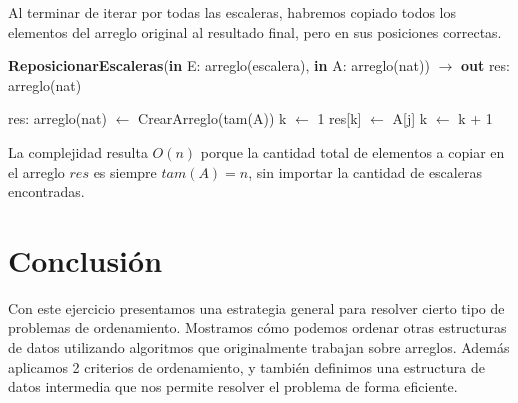 Al terminar de iterar por todas las escaleras, habremos copiado todos los elementos del arreglo original al resultado final, pero en sus posiciones correctas.

\begin{algorithm}[H]
\caption{
    \textbf{ReposicionarEscaleras}(\textbf{in} E: arreglo(escalera), \textbf{in} A: arreglo(nat)) $\to$ \textbf{out} res: arreglo(nat)
}
\begin{algorithmic}[1]
    \State res: arreglo(nat) $\gets$ CrearArreglo(tam(A)) 
    \State k $\gets$ 1
            \State res[k] $\gets$ A[j]
            \State k $\gets$ k + 1
        \EndFor
    \EndFor
\end{algorithmic}
\end{algorithm}

La complejidad resulta $O(n)$ porque la cantidad total de elementos a copiar en el arreglo $res$ es siempre $tam(A) = n$, sin importar la cantidad de escaleras encontradas.


\section*{Conclusión}

Con este ejercicio presentamos una estrategia general para resolver cierto tipo de problemas de ordenamiento. Mostramos cómo podemos ordenar otras estructuras de datos utilizando algoritmos que originalmente trabajan sobre arreglos. Además aplicamos 2 criterios de ordenamiento, y también definimos una estructura de datos intermedia que nos permite resolver el problema de forma eficiente.


